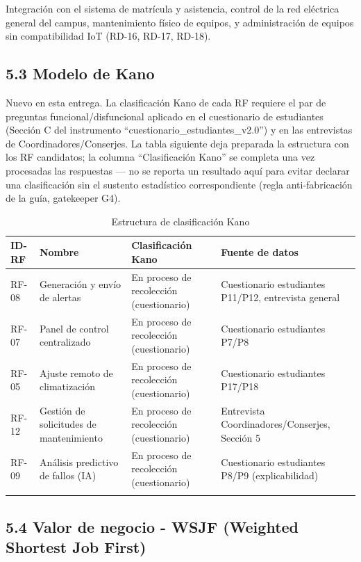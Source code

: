 Integración con el sistema de matrícula y asistencia, control de la red eléctrica general del campus, mantenimiento físico de equipos, y administración de equipos sin compatibilidad IoT (RD-16, RD-17, RD-18).


\subsection*{5.3 Modelo de Kano}


Nuevo en esta entrega. La clasificación Kano de cada RF requiere el par de preguntas funcional/disfuncional aplicado en el cuestionario de estudiantes (Sección C del instrumento ``cuestionario\_estudiantes\_v2.0'') y en las entrevistas de Coordinadores/Conserjes. La tabla siguiente deja preparada la estructura con los RF candidatos; la columna ``Clasificación Kano'' se completa una vez procesadas las respuestas --- no se reporta un resultado aquí para evitar declarar una clasificación sin el sustento estadístico correspondiente (regla anti-fabricación de la guía, gatekeeper G4).


\begingroup
\small
\begin{longtable}{|p{3.9cm}|p{3.9cm}|p{3.9cm}|p{3.9cm}|}
\hline
ID-RF & Nombre & Clasificación Kano & Fuente de datos \\ \hline
RF-08 & Generación y envío de alertas & En proceso de recolección (cuestionario) & Cuestionario estudiantes P11/P12, entrevista general \\ \hline
RF-07 & Panel de control centralizado & En proceso de recolección (cuestionario) & Cuestionario estudiantes P7/P8 \\ \hline
RF-05 & Ajuste remoto de climatización & En proceso de recolección (cuestionario) & Cuestionario estudiantes P17/P18 \\ \hline
RF-12 & Gestión de solicitudes de mantenimiento & En proceso de recolección (cuestionario) & Entrevista Coordinadores/Conserjes, Sección 5 \\ \hline
RF-09 & Análisis predictivo de fallos (IA) & En proceso de recolección (cuestionario) & Cuestionario estudiantes P8/P9 (explicabilidad) \\ \hline
\caption{Estructura de clasificación Kano}
\end{longtable}
\endgroup

\subsection*{5.4 Valor de negocio - WSJF (Weighted Shortest Job First)}

